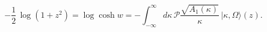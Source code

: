 \begin{equation}
-\frac12\,\log(1+z^2)=\log\cosh w=-\int_{-\infty}^{\infty}d\kappa\,
\mathscr{P}\frac{\sqrt{A_1(\kappa)}}{\kappa}\,
|\kappa,\Omega\rangle(z).
\label{logcosh}
\end{equation}

